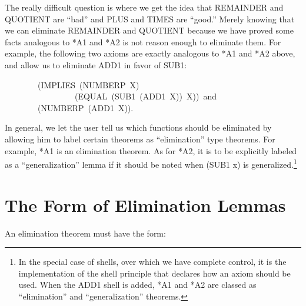 \documentclass[10pt]{book}
\newenvironment{pubasis}{\begin{flushleft}}{\end{flushleft}}
\begin{document}
The really difficult question is where we get the
idea that REMAINDER and QUOTIENT are ``bad''
and PLUS and TIMES are ``good.''  Merely
knowing that we can eliminate REMAINDER and QUOTIENT because we
have proved some facts analogous to *A1 and *A2 is not reason enough
to eliminate them.  For example, the following two axioms
are exactly analogous to
*A1 and *A2 above, and allow us to eliminate ADD1
in favor of SUB1:
\begin{pubasis}
~~~~~~~~(IMPLIES~(NUMBERP~X)\\
~~~~~~~~~~~~~~~~~(EQUAL~(SUB1~(ADD1~X))~X))~and\\

~~~~~~~~(NUMBERP~(ADD1~X)).\\
\end{pubasis}
In general, we let the user tell us which functions should be eliminated
by allowing him to label certain theorems as ``elimination''
type theorems.  For example, *A1 is an elimination theorem.
As for *A2, it 
is to be explicitly labeled as a ``generalization'' lemma if it
should be noted when (SUB1 x) is generalized.\footnote{In the special case of shells, over which we have complete control, it is the implementation of the shell principle that declares how an axiom should be used.  When the ADD1 shell is added, *A1 and *A2 are classed as ``elimination'' and ``generalization'' theorems.}

\section{The Form of Elimination Lemmas}
An elimination theorem must have the form:
\end{document}
